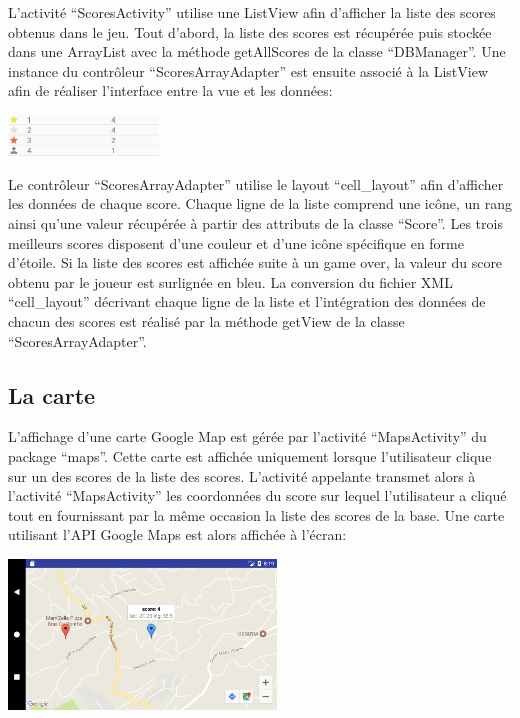 \documentclass{article}
\begin{document}
L'activité \enquote{ScoresActivity} utilise une ListView afin d'afficher la liste des scores obtenus dans le jeu.
Tout d'abord, la liste des scores est récupérée puis stockée dans une ArrayList avec la méthode getAllScores de la classe \enquote{DBManager}. 
Une instance du contrôleur \enquote{ScoresArrayAdapter} est ensuite associé à la ListView afin de réaliser l'interface entre la vue et les données:
\begin{center}
  \includegraphics[width=4cm]{scores_list.png}
\end{center}

Le contrôleur \enquote{ScoresArrayAdapter} utilise le layout \enquote{cell\_layout} afin d'afficher les données de chaque score.
Chaque ligne de la liste comprend une icône, un rang ainsi qu'une valeur récupérée à partir des attributs de la classe \enquote{Score}. 
Les trois meilleurs scores disposent d'une couleur et d'une icône spécifique en forme d'étoile.
Si la liste des scores est affichée suite à un game over, la valeur du score obtenu par le joueur est surlignée en bleu.
La conversion du fichier XML \enquote{cell\_layout} décrivant chaque ligne de la liste et l'intégration des données de chacun des scores est réalisé par la méthode getView de la classe \enquote{ScoresArrayAdapter}. 

\subsection{La carte}
L'affichage d'une carte Google Map est gérée par l'activité \enquote{MapsActivity} du package \enquote{maps}.
Cette carte est affichée uniquement lorsque l'utilisateur clique sur un des scores de la liste des scores.
L'activité appelante transmet alors à l'activité \enquote{MapsActivity} les coordonnées du score sur lequel l'utilisateur a cliqué tout en fournissant par la même occasion la liste des scores de la base.
Une carte utilisant l'API Google Maps est alors affichée à l'écran:
\begin{center}
  \includegraphics[height=4cm]{map_marker.png}
\end{center}
\end{document}
